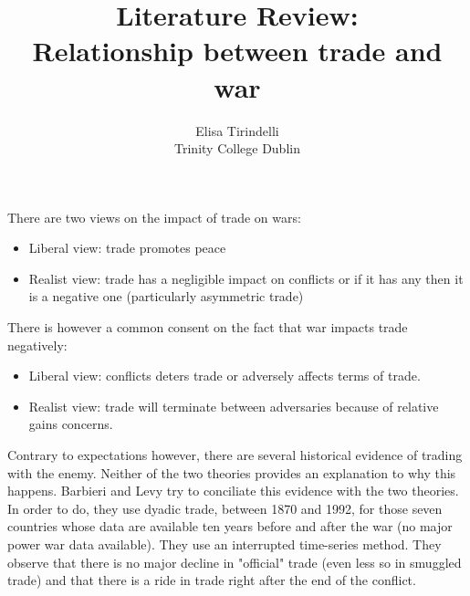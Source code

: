 \documentclass[12pt,a4paper,titlepage,english]{article}
\author{
  Elisa Tirindelli \\ Trinity College Dublin 
}
\title{Literature Review: \\
Relationship between trade and war}
\begin{document}
\maketitle
\section*{\cite{barbieri1999sleeping}}

There are two views on the impact of trade on wars: 
\begin{itemize}
\item{Liberal view: trade promotes peace}
\item{Realist view: trade has a negligible impact on conflicts or if it has any then it is a negative one (particularly asymmetric trade)}
\end{itemize}
There is however a common consent on the fact that war impacts trade negatively:
\begin{itemize}
\item{Liberal view: conflicts deters trade or adversely affects terms of trade.}
\item{Realist view: trade will terminate between adversaries because of relative gains concerns. }
\end{itemize}
Contrary to expectations however, there are several historical evidence of trading with the enemy. Neither of the two theories provides an explanation to why this happens. Barbieri and Levy try to conciliate this evidence with the two theories. In order to do, they use dyadic trade, between 1870 and 1992, for those seven countries whose data are available ten years before and after the war (no major power war data available). They use an interrupted time-series method. They observe that there is no major decline in "official" trade (even less so in smuggled trade) and that there is a ride in trade right after the end of the conflict. 
\end{document}
